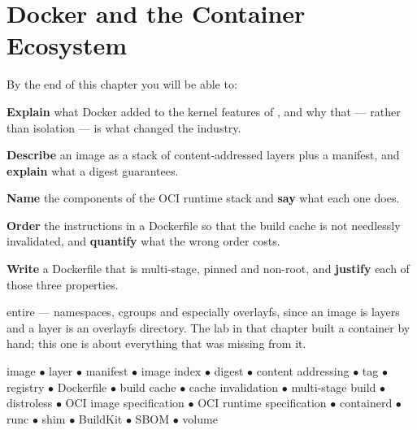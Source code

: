 \chapter{Docker and the Container Ecosystem}\label{ch:docker}

\begin{outcomes}
By the end of this chapter you will be able to:
\begin{tight}
  \item \textbf{Explain} what Docker added to the kernel features of
        , and why that --- rather than isolation --- is what
        changed the industry.
  \item \textbf{Describe} an image as a stack of content-addressed layers plus
        a manifest, and \textbf{explain} what a digest guarantees.
  \item \textbf{Name} the components of the OCI runtime stack and \textbf{say}
        what each one does.
  \item \textbf{Order} the instructions in a Dockerfile so that the build cache
        is not needlessly invalidated, and \textbf{quantify} what the wrong
        order costs.
  \item \textbf{Write} a Dockerfile that is multi-stage, pinned and non-root,
        and \textbf{justify} each of those three properties.
\end{tight}
\end{outcomes}

\begin{prereq}
 entire --- namespaces, cgroups and especially overlayfs,
since an image is layers and a layer is an overlayfs directory. The lab in that
chapter built a container by hand; this one is about everything that was
missing from it.
\end{prereq}

\begin{keyterms}
image $\bullet$ layer $\bullet$ manifest $\bullet$ image index $\bullet$ digest
$\bullet$ content addressing $\bullet$ tag $\bullet$ registry $\bullet$
Dockerfile $\bullet$ build cache $\bullet$ cache invalidation $\bullet$
multi-stage build $\bullet$ distroless $\bullet$ OCI image specification
$\bullet$ OCI runtime specification $\bullet$ containerd $\bullet$ runc
$\bullet$ shim $\bullet$ BuildKit $\bullet$ SBOM $\bullet$ volume
\end{keyterms}


